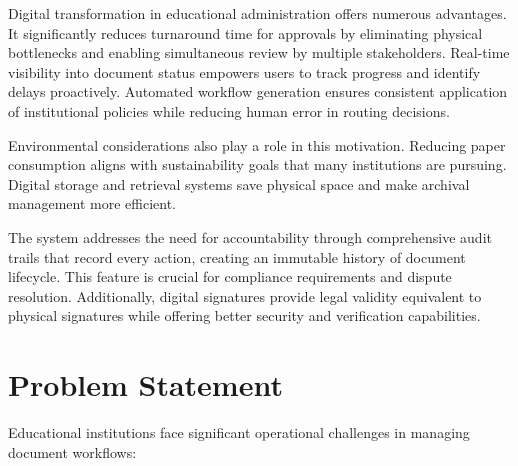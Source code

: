 Digital transformation in educational administration offers numerous advantages. It significantly reduces turnaround time for approvals by eliminating physical bottlenecks and enabling simultaneous review by multiple stakeholders. Real-time visibility into document status empowers users to track progress and identify delays proactively. Automated workflow generation ensures consistent application of institutional policies while reducing human error in routing decisions.

Environmental considerations also play a role in this motivation. Reducing paper consumption aligns with sustainability goals that many institutions are pursuing. Digital storage and retrieval systems save physical space and make archival management more efficient.

The system addresses the need for accountability through comprehensive audit trails that record every action, creating an immutable history of document lifecycle. This feature is crucial for compliance requirements and dispute resolution. Additionally, digital signatures provide legal validity equivalent to physical signatures while offering better security and verification capabilities.

\section{Problem Statement}

Educational institutions face significant operational challenges in managing document workflows:

